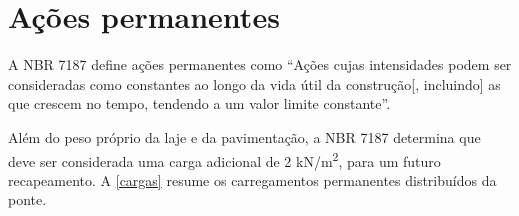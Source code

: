 \section{Ações permanentes}

A NBR 7187 \cite[p.~4]{NBR7187:2013} define ações permanentes como ``Ações cujas intensidades podem ser consideradas como constantes ao longo da vida útil da construção[, incluindo] as que crescem no tempo, tendendo a um valor limite constante''.


Além do peso próprio da laje e da pavimentação, a NBR 7187 \cite[p.~4]{NBR7187:2013} determina que deve ser considerada uma carga adicional de 2 kN/m\textsuperscript{2}, para um futuro recapeamento. A \autoref{cargas} resume os carregamentos permanentes distribuídos da ponte.


